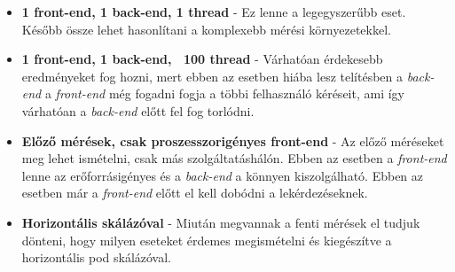 \begin{itemize}
\item \textbf{1 front-end, 1 back-end, 1 thread} - Ez lenne a legegyszerűbb eset. Később össze lehet hasonlítani a komplexebb mérési környezetekkel.
\item \textbf{1 front-end, 1 back-end, ~100 thread} - Várhatóan érdekesebb eredményeket fog hozni, mert ebben az esetben hiába lesz telítésben a \textit{back-end} a \textit{front-end} még fogadni fogja a többi felhasználó kéréseit, ami így várhatóan a \textit{back-end} előtt fel fog torlódni.
\item \textbf{Előző mérések, csak proszesszorigényes front-end} - Az előző méréseket meg lehet ismételni, csak más szolgáltatáshálón. Ebben az esetben a \textit{front-end} lenne az erőforrásigényes és a \textit{back-end} a könnyen kiszolgálható. Ebben az esetben már a \textit{front-end} előtt el kell dobódni a lekérdezéseknek.
\item \textbf{Horizontális skálázóval} - Miután megvannak a fenti mérések el tudjuk dönteni, hogy milyen eseteket érdemes megismételni és kiegészítve a horizontális pod skálázóval.
\end{itemize}